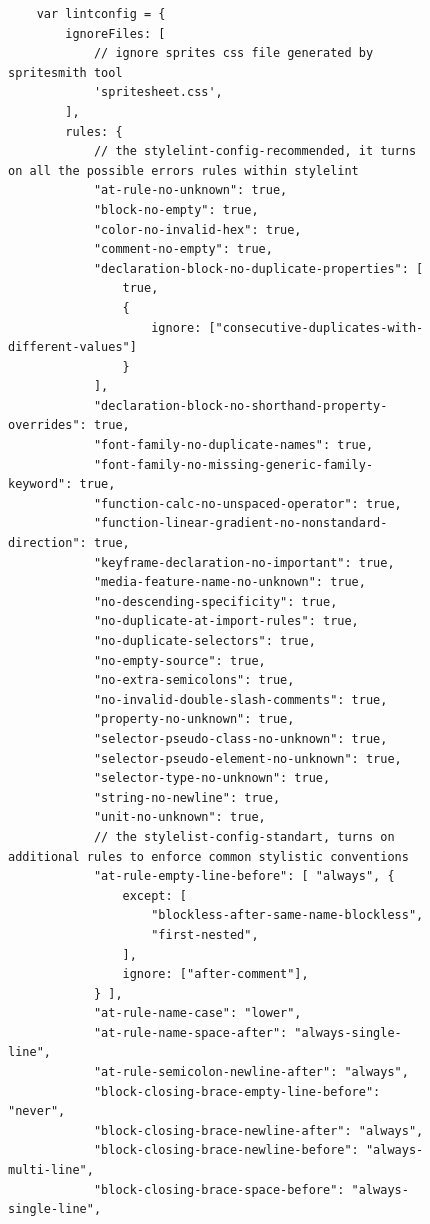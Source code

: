 \begin{figure}[h!]
    \centering

\begin{small}
\begin{verbatim}
    var lintconfig = {
        ignoreFiles: [
            // ignore sprites css file generated by spritesmith tool
            'spritesheet.css',
        ],
        rules: {
            // the stylelint-config-recommended, it turns on all the possible errors rules within stylelint
            "at-rule-no-unknown": true,
            "block-no-empty": true,
            "color-no-invalid-hex": true,
            "comment-no-empty": true,
            "declaration-block-no-duplicate-properties": [
                true,
                {
                    ignore: ["consecutive-duplicates-with-different-values"]
                }
            ],
            "declaration-block-no-shorthand-property-overrides": true,
            "font-family-no-duplicate-names": true,
            "font-family-no-missing-generic-family-keyword": true,
            "function-calc-no-unspaced-operator": true,
            "function-linear-gradient-no-nonstandard-direction": true,
            "keyframe-declaration-no-important": true,
            "media-feature-name-no-unknown": true,
            "no-descending-specificity": true,
            "no-duplicate-at-import-rules": true,
            "no-duplicate-selectors": true,
            "no-empty-source": true,
            "no-extra-semicolons": true,
            "no-invalid-double-slash-comments": true,
            "property-no-unknown": true,
            "selector-pseudo-class-no-unknown": true,
            "selector-pseudo-element-no-unknown": true,
            "selector-type-no-unknown": true,
            "string-no-newline": true,
            "unit-no-unknown": true,
            // the stylelist-config-standart, turns on additional rules to enforce common stylistic conventions
            "at-rule-empty-line-before": [ "always", {
                except: [
                    "blockless-after-same-name-blockless",
                    "first-nested",
                ],
                ignore: ["after-comment"],
            } ],
            "at-rule-name-case": "lower",
            "at-rule-name-space-after": "always-single-line",
            "at-rule-semicolon-newline-after": "always",
            "block-closing-brace-empty-line-before": "never",
            "block-closing-brace-newline-after": "always",
            "block-closing-brace-newline-before": "always-multi-line",
            "block-closing-brace-space-before": "always-single-line",

\end{verbatim}
\end{small}
\end{figure}
